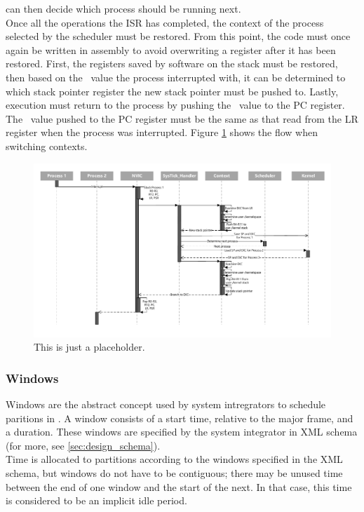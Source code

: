 can then decide which process should be running next.\\
Once all the operations the ISR has completed, the context of the process
selected by the scheduler must be restored. From this point, the code must once
again be written in assembly to avoid overwriting a register after it has been 
restored. First, the registers saved by software on the stack must be restored,
then based on the \excreturn\ value the process interrupted with, it can be 
determined to which stack pointer register the new stack pointer must be pushed
to. Lastly, execution must return to the process by pushing the \excreturn\ value
to the PC register. The \excreturn\ value pushed to the PC register must be the
same as that read from the LR register when the process was interrupted.
Figure \ref{fig:scheduling_sequence_diagram} shows the flow when switching contexts.
\begin{figure}
    \includegraphics[width=\textwidth]{figures/scheduling_sequence_diagram.pdf}
    \caption{This is just a placeholder.}
    \label{fig:scheduling_sequence_diagram}
\end{figure}

\subsubsection{Windows}
Windows are the abstract concept used by system intregrators to schedule
paritions in \arinc . A window consists of a start time, relative to the major
frame, and a duration. These windows are specified by the system integrator in
XML schema (for more, see \ref{sec:design_schema}).\\
Time is allocated to partitions according to the windows specified in the XML
schema, but windows do not have to be contiguous; there may be unused time
between the end of one window and the start of the next. In that case, this time
is considered to be an implicit idle period.

